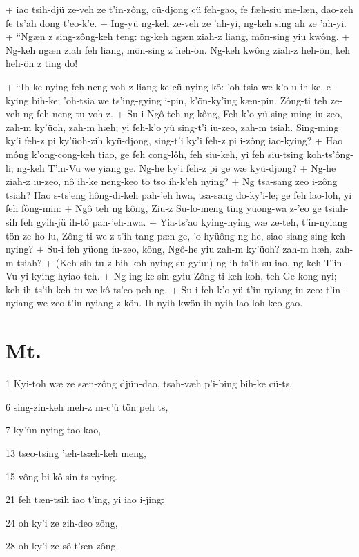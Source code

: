 +	iao tsih-djü ze-veh ze t'in-zông, cü-djong cü feh-gao, fe fæh-siu me-læn, dao-zeh fe ts'ah dong t'eo-k'e.
+	Ing-yü ng-keh ze-veh ze 'ah-yi, ng-keh sing ah ze 'ah-yi.
+	``Ngæn z sing-zông-keh teng: ng-keh ngæn ziah-z liang, mön-sing yiu kwông.
+	Ng-keh ngæn ziah feh liang, mön-sing z heh-ön. Ng-keh kwông ziah-z heh-ön, keh heh-ön z ting do!
\par
+	``Ih-ke nying feh neng voh-z liang-ke cü-nying-kô: 'oh-tsia we k'o-u ih-ke, e-kying bih-ke; 'oh-tsia we ts'ing-gying i-pin, k'ön-ky'ing kæn-pin. Zông-ti teh ze-veh ng feh neng tu voh-z.
+	Su-i Ngô teh ng kông, Feh-k'o yü sing-ming iu-zeo, zah-m ky'üoh, zah-m hæh; yi feh-k'o yü sing-t'i iu-zeo, zah-m tsiah. Sing-ming ky'i feh-z pi ky'üoh-zih kyü-djong, sing-t'i ky'i feh-z pi i-zông iao-kying?
+	Hao mông k'ong-cong-keh tiao, ge feh cong-lôh, feh siu-keh, yi feh siu-tsing koh-ts'ông-li; ng-keh T'in-Vu we yiang ge. Ng-he ky'i feh-z pi ge wæ kyü-djong?
+	Ng-he ziah-z iu-zeo, nô ih-ke neng-keo to tso ih-k'eh nying?
+	Ng tsa-sang zeo i-zông tsiah? Hao s-ts'eng hông-di-keh pah-'eh hwa, tsa-sang do-ky'i-le; ge feh lao-loh, yi feh fông-min:
+	Ngô teh ng kông, Ziu-z Su-lo-meng ting yüong-wa z-'eo ge tsiah-sih feh gyih-jü ih-tô pah-'eh-hwa.
+	Yia-ts'ao kying-nying wæ ze-teh, t'in-nyiang tön ze ho-lu, Zông-ti we z-t'ih tang-pæn ge, 'o-hyüông ng-he, siao siang-sing-keh nying?
+	Su-i feh yüong iu-zeo, kông, Ngô-he yiu zah-m ky'üoh? zah-m hæh, zah-m tsiah?
+	(Keh-sih tu z bih-koh-nying su gyiu:) ng ih-ts'ih su iao, ng-keh T'in-Vu yi-kying hyiao-teh.
+	Ng ing-ke sin gyiu Zông-ti keh koh, teh Ge kong-nyi; keh ih-ts'ih-keh tu we kô-ts'eo peh ng.
+	Su-i feh-k'o yü t'in-nyiang iu-zeo: t'in-nyiang we zeo t'in-nyiang z-kön. Ih-nyih kwön ih-nyih lao-loh keo-gao.



\section{Mt.}%

\begin{sAbstract}
	\item[1] Kyi-toh wæ ze sæn-zông djün-dao, tsah-væh p'i-bing bih-ke cü-ts.
	\item[6] sing-zin-keh meh-z m-c'ü tön peh ts,
	\item[7] ky'ün nying tao-kao,
	\item[13] tseo-tsing 'æh-tsæh-keh meng,
	\item[15] vông-bi kô sin-ts-nying.
	\item[21] feh tæn-tsih iao t'ing, yi iao i-jing:
	\item[24] oh ky'i ze zih-deo zông,
	\item[28] oh ky'i ze sô-t'æn-zông. 
\end{sAbstract}

